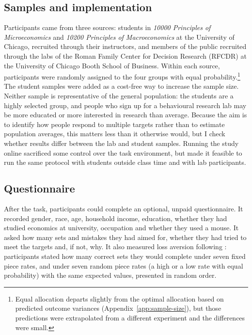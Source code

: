 \documentclass[12pt, letterpaper]{article}
\begin{document}
\subsection{Samples and implementation}

Participants came from three sources: students in \emph{10000 Principles of Microeconomics} and \emph{10200 Principles of Macroeconomics} at the University of Chicago, recruited through their instructors, and members of the public recruited through the labs of the Roman Family Center for Decision Research (RFCDR) at the University of Chicago Booth School of Business. Within each source, participants were randomly assigned to the four groups with equal probability.\footnote{Equal allocation departs slightly from the optimal allocation based on predicted outcome variances (Appendix~\ref{app:sample-size}), but those predictions were extrapolated from a different experiment and the differences were small.} The student samples were added as a cost-free way to increase the sample size. Neither sample is representative of the general population: the students are a highly selected group, and people who sign up for a behavioural research lab may be more educated or more interested in research than average. Because the aim is to identify how people respond to multiple targets rather than to estimate population averages, this matters less than it otherwise would, but I check whether results differ between the lab and student samples. Running the study online sacrificed some control over the task environment, but made it feasible to run the same protocol with students outside class time and with lab participants.

\subsection{Questionnaire}

After the task, participants could complete an optional, unpaid questionnaire. It recorded gender, race, age, household income, education, whether they had studied economics at university, occupation and whether they used a mouse. It asked how many sets and mistakes they had aimed for, whether they had tried to meet the targets and, if not, why. It also measured loss aversion following \textcite{campos-mercade.2024.gustibusdisputes}: participants stated how many correct sets they would complete under seven fixed piece rates, and under seven random piece rates (a high or a low rate with equal probability) with the same expected values, presented in random order.
\end{document}
